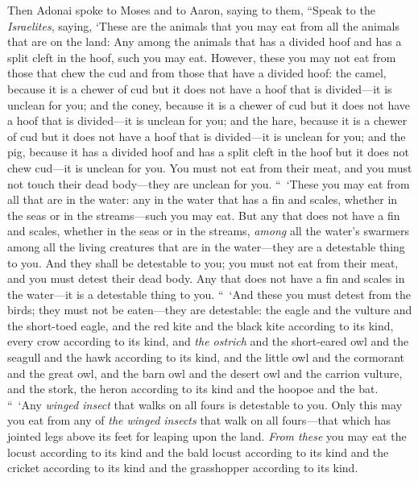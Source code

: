 \begin{biblechapter} %
 Then Adonai spoke to Moses and to Aaron, saying to them,
\verse “Speak to the \textit{Israelites}, saying, ‘These are the animals that you may eat from all the animals that are on the land:
\verse Any among the animals that has a divided hoof and has a split cleft in the hoof, such you may eat.
\verse However, these you may not eat from those that chew the cud and from those that have a divided hoof: the camel, because it is a chewer of cud but it does not have a hoof that is divided—it is unclean for you;
\verse and the coney, because it is a chewer of cud but it does not have a hoof that is divided—it is unclean for you;
\verse and the hare, because it is a chewer of cud but it does not have a hoof that is divided—it is unclean for you;
\verse and the pig, because it has a divided hoof and has a split cleft in the hoof but it does not chew cud—it is unclean for you.
\verse You must not eat from their meat, and you must not touch their dead body—they are unclean for you.
\verse “ ‘These you may eat from all that are in the water: any in the water that has a fin and scales, whether in the seas or in the streams—such you may eat.
\verse But any that does not have a fin and scales, whether in the seas or in the streams, \textit{among} all the water’s swarmers among all the living creatures that are in the water—they are a detestable thing to you.
\verse And they shall be detestable to you; you must not eat from their meat, and you must detest their dead body.
\verse Any that does not have a fin and scales in the water—it is a detestable thing to you.
\verse “ ‘And these you must detest from the birds; they must not be eaten—they are detestable: the eagle and the vulture and the short-toed eagle,
\verse and the red kite and the black kite according to its kind,
\verse every crow according to its kind,
\verse and \textit{the ostrich} and the short-eared owl and the seagull and the hawk according to its kind,
\verse and the little owl and the cormorant and the great owl,
\verse and the barn owl and the desert owl and the carrion vulture,
\verse and the stork, the heron according to its kind and the hoopoe and the bat.
\verse “ ‘Any \textit{winged insect} that walks on all fours is detestable to you.
\verse Only this may you eat from any of \textit{the winged insects} that walk on all fours—that which has jointed legs above its feet for leaping upon the land.
\verse \textit{From these} you may eat the locust according to its kind and the bald locust according to its kind and the cricket according to its kind and the grasshopper according to its kind.

\end{biblechapter}
